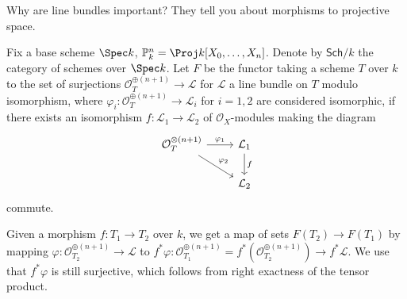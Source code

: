 Why are line bundles important? They tell you about morphisms to projective space.

Fix a base scheme $\Spec k$, $\mathbb{P}_k^n = \Proj k[X_0, \ldots, X_n]$. Denote
by
$\mathsf{Sch}/k$ the category of schemes over $\Spec k$. Let
$F$ be the functor taking a scheme $T$ over $k$ to the set of surjections
$\mathcal{O}_T^{\oplus(n+1)}\to \mathcal{L}$ for $\mathcal{L}$ a line bundle on $T$
modulo isomorphism, where $\varphi_i\colon \mathcal{O}_T^{\oplus(n+1)}\to \mathcal{L}_i$ for $i = 1, 2$  are
considered isomorphic, if there exists an isomorphism $f\colon \mathcal{L}_1\to \mathcal{L}_2$
of $\mathcal{O}_X$-modules making the diagram
\[\begin{tikzcd}
	\mathcal{O}_T^{\otimes(n+1)}\ar[r, "\varphi_1"]\ar[dr, "\varphi_2"] & \mathcal{L}_1\ar[d, "f"]\\
	& \mathcal{L}_2
\end{tikzcd}\]
commute.

Given a morphism $f\colon T_1\to T_2$ over $k$, we get a map of sets
$F(T_2)\to F(T_1)$ by mapping  $\varphi\colon \mathcal{O}_{T_2}^{\oplus(n+1)}\to \mathcal{L}$ to
$f^*\varphi\colon \mathcal{O}_{T_1}^{\oplus(n+1)} = f^*(\mathcal{O}_{T_2}^{\oplus(n+1)})\to f^*\mathcal{L}$.
We use that  $f^*\varphi$ is still surjective, which follows from right exactness of
the tensor product.
